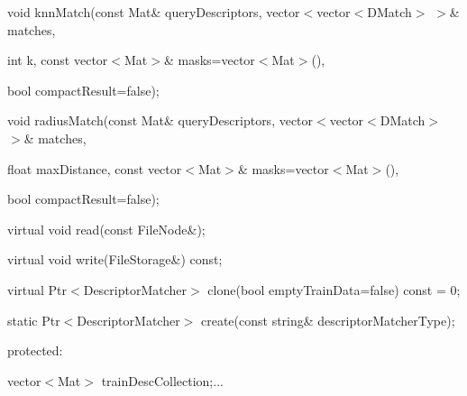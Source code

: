 {\ttfamily }

{\ttfamily }

{\ttfamily void knn\+Match(const Mat\& query\+Descriptors, vector$<$vector$<$\+D\+Match$>$ $>$\& matches,}

{\ttfamily }

{\ttfamily }

{\ttfamily int k, const vector$<$\+Mat$>$\& masks=vector$<$\+Mat$>$(),}

{\ttfamily }

{\ttfamily }

{\ttfamily bool compact\+Result=false);}

{\ttfamily }

{\ttfamily }

{\ttfamily void radius\+Match(const Mat\& query\+Descriptors, vector$<$vector$<$\+D\+Match$>$ $>$\& matches,}

{\ttfamily }

{\ttfamily }

{\ttfamily float max\+Distance, const vector$<$\+Mat$>$\& masks=vector$<$\+Mat$>$(),}

{\ttfamily }

{\ttfamily }

{\ttfamily bool compact\+Result=false);}

{\ttfamily }

{\ttfamily }

{\ttfamily virtual void read(const File\+Node\&);}

{\ttfamily }

{\ttfamily }

{\ttfamily virtual void write(\+File\+Storage\&) const;}

{\ttfamily }

{\ttfamily }

{\ttfamily virtual Ptr$<$\+Descriptor\+Matcher$>$ clone(bool empty\+Train\+Data=false) const = 0;}

{\ttfamily }

{\ttfamily }

{\ttfamily static Ptr$<$\+Descriptor\+Matcher$>$ create(const string\& descriptor\+Matcher\+Type);}

{\ttfamily }

{\ttfamily }

{\ttfamily protected\+:}

{\ttfamily }

{\ttfamily }

{\ttfamily vector$<$\+Mat$>$ train\+Desc\+Collection;...}

